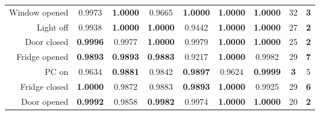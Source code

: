 \begin{table*}
\begin{center}
{\begin{tabular}{r|cc|cc|cc|cc}
				\midrule
				Window opened                                            & 0.9973                              & \textbf{1.0000}                     & 0.9665                              & \textbf{1.0000}                     & \textbf{1.0000}                     & \textbf{1.0000}                     & 32                                  & \textbf{3}                          \\
				Light off                                                & 0.9938                              & \textbf{1.0000}                     & \textbf{1.0000}                     & 0.9442                              & \textbf{1.0000}                     & \textbf{1.0000}                     & 27                                  & \textbf{2}                          \\
				Door closed                                              & \textbf{0.9996}                     & 0.9977                              & \textbf{1.0000}                     & 0.9979                              & \textbf{1.0000}                     & \textbf{1.0000}                     & 25                                  & \textbf{2}                          \\
				Fridge opened                                            & \textbf{0.9893}                     & \textbf{0.9893}                     & \textbf{0.9883}                     & 0.9217                              & \textbf{1.0000}                     & 0.9982                              & 29                                  & \textbf{7}                          \\
				PC on                                                    & 0.9634                              & \textbf{0.9881}                     & 0.9842                              & \textbf{0.9897}                     & 0.9624                              & \textbf{0.9999}                     & \textbf{3}                          & 5                                   \\
				Fridge closed                                            & \textbf{1.0000}                     & 0.9872                              & 0.9883                              & \textbf{0.9893}                     & \textbf{1.0000}                     & 0.9925                              & 29                                  & \textbf{6}                          \\
				Door opened                                              & \textbf{0.9992}                     & 0.9858                              & \textbf{0.9982}                     & 0.9974                              & \textbf{1.0000}                     & \textbf{1.0000}                     & 20                                  & \textbf{2}                          \\

\end{tabular}}
\end{center}
\end{table*}
